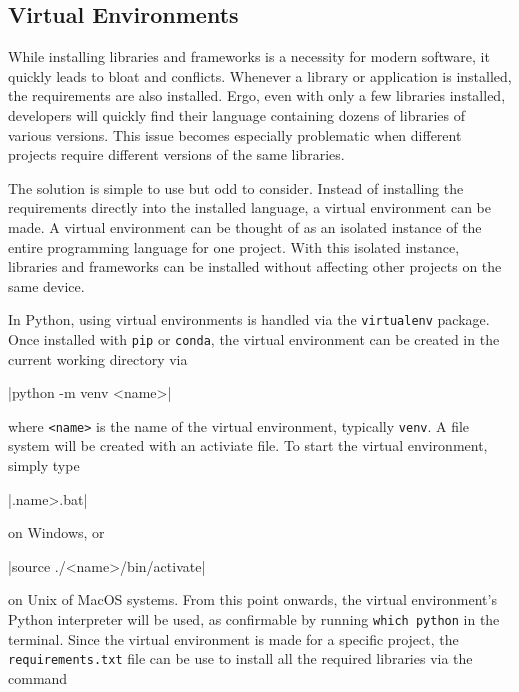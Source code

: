 \documentclass[11pt]{article}
\begin{document}
\inputminted[linenos=true]{python}{python_examples/requirements_example.txt}

\subsection{Virtual Environments}

While installing libraries and frameworks is a necessity for modern software, it quickly leads to bloat and conflicts. Whenever a library or application is installed, the requirements are also installed. Ergo, even with only a few libraries installed, developers will quickly find their language containing dozens of libraries of various versions. This issue becomes especially problematic when different projects require different versions of the same libraries.

The solution is simple to use but odd to consider. Instead of installing the requirements directly into the installed language, a virtual environment can be made. A virtual environment can be thought of as an isolated instance of the entire programming language for one project. With this isolated instance, libraries and frameworks can be installed without affecting other projects on the same device.

In Python, using virtual environments is handled via the \texttt{virtualenv} package. Once installed with \texttt{pip} or \texttt{conda}, the virtual environment can be created in the current working directory via

|python -m venv <name>|

\noindent
where \texttt{<name>} is the name of the virtual environment, typically \texttt{venv}. A file system will be created with an activiate file. To start the virtual environment, simply type

|.\<name>\Scripts\activate.bat|

\noindent
on Windows, or

|source ./<name>/bin/activate|

\noindent
on Unix of MacOS systems. From this point onwards, the virtual environment's Python interpreter will be used, as confirmable by running \texttt{which python} in the terminal. Since the virtual environment is made for a specific project, the \texttt{requirements.txt} file can be use to install all the required libraries via the command
\end{document}
